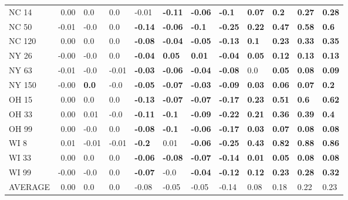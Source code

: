 \begin{tabular}{lrllllllllll}
NC 14   &     0.00 &             0.0 &            0.0 &           -0.01 &          \textbf{-0.11} &  \textbf{-0.06} &   \textbf{-0.1} &   \textbf{0.07} &   \textbf{0.2} &   \textbf{0.27} &   \textbf{0.28} \\
NC 50   &    -0.01 &            -0.0 &            0.0 &  \textbf{-0.14} &          \textbf{-0.06} &   \textbf{-0.1} &  \textbf{-0.25} &   \textbf{0.22} &  \textbf{0.47} &   \textbf{0.58} &    \textbf{0.6} \\
NC 120  &     0.00 &             0.0 &            0.0 &  \textbf{-0.08} &          \textbf{-0.04} &  \textbf{-0.05} &  \textbf{-0.13} &    \textbf{0.1} &  \textbf{0.23} &   \textbf{0.33} &   \textbf{0.35} \\
NY 26   &    -0.00 &            -0.0 &            0.0 &  \textbf{-0.04} &           \textbf{0.05} &   \textbf{0.01} &  \textbf{-0.04} &   \textbf{0.05} &  \textbf{0.12} &   \textbf{0.13} &   \textbf{0.13} \\
NY 63   &    -0.01 &            -0.0 &          -0.01 &  \textbf{-0.03} &          \textbf{-0.06} &  \textbf{-0.04} &  \textbf{-0.08} &             0.0 &  \textbf{0.05} &   \textbf{0.08} &   \textbf{0.09} \\
NY 150  &    -0.00 &    \textbf{0.0} &           -0.0 &  \textbf{-0.05} &          \textbf{-0.07} &  \textbf{-0.03} &  \textbf{-0.09} &   \textbf{0.03} &  \textbf{0.06} &   \textbf{0.07} &    \textbf{0.2} \\
OH 15   &     0.00 &             0.0 &            0.0 &  \textbf{-0.13} &          \textbf{-0.07} &  \textbf{-0.07} &  \textbf{-0.17} &   \textbf{0.23} &  \textbf{0.51} &    \textbf{0.6} &   \textbf{0.62} \\
OH 33   &     0.00 &            0.01 &           -0.0 &  \textbf{-0.11} &           \textbf{-0.1} &  \textbf{-0.09} &  \textbf{-0.22} &   \textbf{0.21} &  \textbf{0.36} &   \textbf{0.39} &    \textbf{0.4} \\
OH 99   &     0.00 &            -0.0 &            0.0 &  \textbf{-0.08} &           \textbf{-0.1} &  \textbf{-0.06} &  \textbf{-0.17} &   \textbf{0.03} &  \textbf{0.07} &   \textbf{0.08} &   \textbf{0.08} \\
WI 8    &     0.01 &           -0.01 &          -0.01 &   \textbf{-0.2} &                    0.01 &  \textbf{-0.06} &  \textbf{-0.25} &   \textbf{0.43} &  \textbf{0.82} &   \textbf{0.88} &   \textbf{0.86} \\
WI 33   &     0.00 &             0.0 &            0.0 &  \textbf{-0.06} &          \textbf{-0.08} &  \textbf{-0.07} &  \textbf{-0.14} &   \textbf{0.01} &  \textbf{0.05} &   \textbf{0.08} &   \textbf{0.08} \\
WI 99   &    -0.00 &            -0.0 &            0.0 &  \textbf{-0.07} &                    -0.0 &  \textbf{-0.04} &  \textbf{-0.12} &   \textbf{0.12} &  \textbf{0.23} &   \textbf{0.28} &   \textbf{0.32} \\
AVERAGE &     0.00 &             0.0 &            0.0 &           -0.08 &                   -0.05 &           -0.05 &           -0.14 &            0.08 &           0.18 &            0.22 &            0.23 \\
\bottomrule
\end{tabular}
